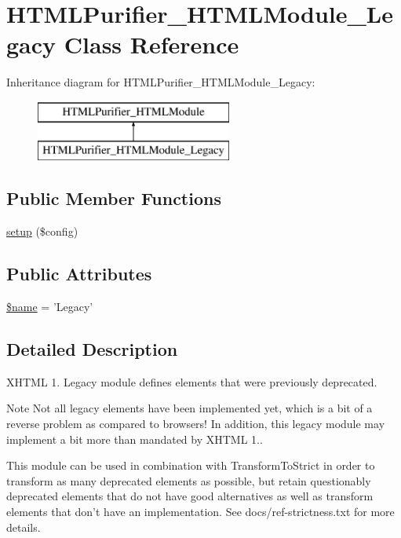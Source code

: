 \hypertarget{classHTMLPurifier__HTMLModule__Legacy}{\section{H\+T\+M\+L\+Purifier\+\_\+\+H\+T\+M\+L\+Module\+\_\+\+Legacy Class Reference}
\label{classHTMLPurifier__HTMLModule__Legacy}
}
Inheritance diagram for H\+T\+M\+L\+Purifier\+\_\+\+H\+T\+M\+L\+Module\+\_\+\+Legacy\+:\begin{figure}[H]
\begin{center}
\leavevmode
\includegraphics[height=2.000000cm]{classHTMLPurifier__HTMLModule__Legacy}
\end{center}
\end{figure}
\subsection*{Public Member Functions}
\begin{DoxyCompactItemize}
\item 
\hyperlink{classHTMLPurifier__HTMLModule__Legacy_a7877429154e10473cbb2b05aa107f31a}{setup} (\$config)
\end{DoxyCompactItemize}
\subsection*{Public Attributes}
\begin{DoxyCompactItemize}
\item 
\hyperlink{classHTMLPurifier__HTMLModule__Legacy_a712964245293b6ba5a55406cd6b635a0}{\$name} = 'Legacy'
\end{DoxyCompactItemize}


\subsection{Detailed Description}
X\+H\+T\+M\+L 1. Legacy module defines elements that were previously deprecated.

\begin{DoxyNote}{Note}
Not all legacy elements have been implemented yet, which is a bit of a reverse problem as compared to browsers! In addition, this legacy module may implement a bit more than mandated by X\+H\+T\+M\+L 1..
\end{DoxyNote}
This module can be used in combination with Transform\+To\+Strict in order to transform as many deprecated elements as possible, but retain questionably deprecated elements that do not have good alternatives as well as transform elements that don't have an implementation. See docs/ref-\/strictness.\+txt for more details. 

